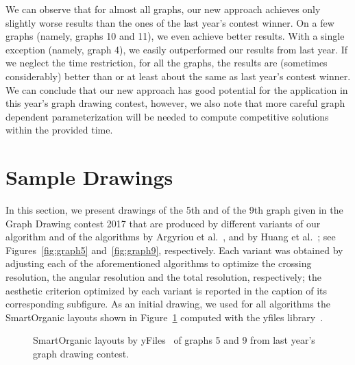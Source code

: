 \documentclass[runningheads]{llncs}
\begin{document}
{We can observe that for almost all graphs, our new approach achieves only slightly worse results than the ones of the last year's contest winner. On a few graphs (namely, graphs 10 and 11), we even achieve better results. With a single exception (namely, graph 4), we easily outperformed our results from last year.
If we neglect the time restriction, for all the graphs, the results  are (sometimes considerably) better than or at least about the same as last year's contest winner. We can conclude that our new approach has good potential for the application in this year's graph drawing contest, however, we also note that more careful graph dependent parameterization will be needed to compute competitive solutions within the provided time.


\section{Sample Drawings}
\label{app:samples}

In this section, we present drawings of the 5th and of the 9th graph given in the Graph Drawing contest 2017 that are produced by different variants of our algorithm and of the algorithms by Argyriou et al.~\cite{DBLP:journals/cj/ArgyriouBS13}, and by Huang et al.~\cite{DBLP:journals/vlc/HuangEHL13}; see Figures~\ref{fig:graph5} and~\ref{fig:graph9}, respectively. Each variant was obtained by adjusting each of the aforementioned algorithms to optimize the crossing resolution, the angular resolution and the total resolution, respectively; the aesthetic criterion optimized by each variant is reported in the caption of its corresponding subfigure. As an initial drawing, we used for all algorithms the SmartOrganic layouts shown in Figure~\ref{fig:graph5And9-yfiles} computed with the yfiles library~\cite{DBLP:books/sp/04/WieseE004}.

\begin{figure}[htbp]
\centering
{}
\hfil
{}
\caption{SmartOrganic layouts by yFiles~\cite{DBLP:books/sp/04/WieseE004} of graphs 5 and 9 from last year's graph drawing contest.}
\label{fig:graph5And9-yfiles}
\end{figure}

}
\end{document}
